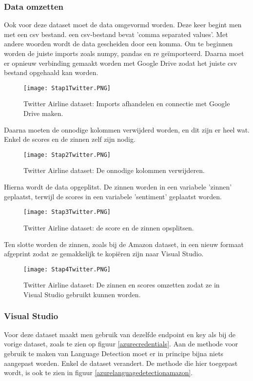 \subsubsection{Data omzetten}
\label{twitterdatasetomzettenazure}
Ook voor deze dataset moet de data omgevormd worden. Deze keer begint men met een csv bestand. een \gls{csv}-bestand bevat 'comma separated values'. Met andere woorden wordt de data gescheiden door een komma. Om te beginnen worden de juiste imports zoals \gls{numpy}, \gls{pandas} en \gls{re} geïmporteerd. Daarna moet er opnieuw verbinding gemaakt worden met Google Drive zodat het juiste csv bestand opgehaald kan worden. 
\begin{figure}[!htbp]
    \texttt{[image: Stap1Twitter.PNG]}
    \caption{\label{azurestap1twitter}Twitter Airline dataset: Imports afhandelen en connectie met Google Drive maken.}
\end{figure}
\FloatBarrier 

Daarna moeten de onnodige kolommen verwijderd worden, en dit zijn er heel wat. Enkel de scores en de zinnen zelf zijn nodig.
\begin{figure}[!htbp]
    \texttt{[image: Stap2Twitter.PNG]}
    \caption{\label{azurestap2twitter}Twitter Airline dataset: De onnodige kolommen verwijderen.}
\end{figure}
\FloatBarrier 

Hierna wordt de data opgeplitst. De zinnen worden in een variabele 'zinnen' geplaatst, terwijl de scores in een variabele 'sentiment' geplaatst worden. 
\begin{figure}[!htbp]
    \texttt{[image: Stap3Twitter.PNG]}
    \caption{\label{azurestap3twitter}Twitter Airline dataset: de score en de zinnen opsplitsen.}
\end{figure}
\FloatBarrier
Ten slotte worden de zinnen, zoals bij de Amazon dataset, in een nieuw formaat afgeprint zodat ze gemakkelijk te kopiëren zijn naar Visual Studio. 
\begin{figure}[!htbp]
    \texttt{[image: Stap4Twitter.PNG]}
    \caption{\label{azurestap4twitter}Twitter Airline dataset: De zinnen en scores omzetten zodat ze in Visual Studio gebruikt kunnen worden.}
\end{figure}
\FloatBarrier 

\subsubsection{Visual Studio}
\label{twitterdatasetvisualstudioazure}
Voor deze dataset maakt men gebruik van dezelfde endpoint en key als bij de vorige dataset, zoals te zien op figuur \ref{azurecredentials}. Aan de methode voor gebruik te maken van Language Detection moet er in principe bijna niets aangepast worden. Enkel de dataset verandert. De methode die hier toegepast wordt, is ook te zien in figuur \ref{azurelanguagedetectionamazon}.

